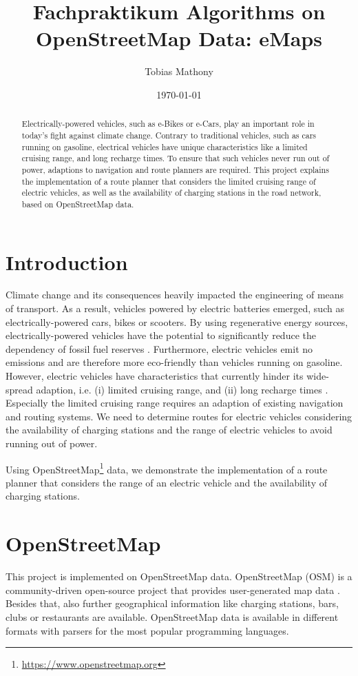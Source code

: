\documentclass[a4paper]{article}
\author{Tobias Mathony}
\title{Fachpraktikum Algorithms on OpenStreetMap Data: eMaps}
\date{\today}
\begin{document}
\maketitle
\begin{abstract}
Electrically-powered vehicles, such as e-Bikes or e-Cars, play an important role in today's fight against climate change.
Contrary to traditional vehicles, such as cars running on gasoline, electrical vehicles have unique characteristics like a limited cruising range, and long recharge times.
To ensure that such vehicles never run out of power, adaptions to navigation and route planners are required.
This project explains the implementation of a route planner that considers the limited cruising range of electric vehicles, as well as the availability of charging stations in the road network, based on OpenStreetMap data. 
\end{abstract}
\section{Introduction}
Climate change and its consequences heavily impacted the engineering of means of transport.
As a result, vehicles powered by electric batteries emerged, such as electrically-powered cars, bikes or scooters.
By using regenerative energy sources, electrically-powered vehicles have the potential to significantly reduce the dependency of fossil fuel reserves \cite{Artmeier2010}.
Furthermore, electric vehicles emit no emissions and are therefore more eco-friendly than vehicles running on gasoline.
However, electric vehicles have characteristics that currently hinder its wide-spread adaption, i.e. (i) limited cruising range, and (ii) long recharge times \cite{Artmeier2010}.
Especially the limited cruising range requires an adaption of existing navigation and routing systems.
We need to determine routes for electric vehicles considering the availability of charging stations and the range of electric vehicles to avoid running out of power.\par\medskip
Using OpenStreetMap\footnote{\url{https://www.openstreetmap.org}} data, we demonstrate the implementation of a route planner that considers the range of an electric vehicle and the availability of charging stations. 
\section{OpenStreetMap}
This project is implemented on OpenStreetMap data.
OpenStreetMap (OSM) is a community-driven open-source project that provides user-generated map data \cite{Haklay2008}.
Besides that, also further geographical information like charging stations, bars, clubs or restaurants are available.
OpenStreetMap data is available in different formats with parsers for the most popular programming languages.\par\medskip
\end{document}
